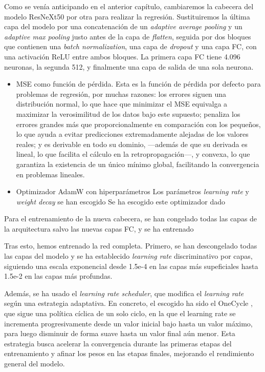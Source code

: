 Como se venía anticipando en el anterior capítulo, cambiaremos la cabecera del modelo ResNeXt50 por otra 
para realizar la regresión. Sustituiremos la última capa del modelo por una concatenación de un 
\textit{adaptive average pooling} y un \textit{adaptive max pooling} justo antes de la capa de 
\textit{flatten}, seguida por dos bloques que contienen una \textit{batch normalization}, una capa de 
\textit{dropout} y una capa FC, con una activación ReLU entre ambos bloques. La primera capa FC tiene
4.096 neuronas, la segunda 512, y finalmente una capa de salida de una sola neurona. 

\begin{itemize}
    \item MSE como función de pérdida. Esta es la función de pérdida por defecto para problemas de regresión,
        por muchas razones: los errores siguen una distribución normal, lo que hace que minimizar el MSE 
        equivalga a maximizar la verosimilitud de los datos bajo este supuesto;
        penaliza los errores grandes más que proporcionalmente en comparación con los pequeños, lo que ayuda a
        evitar predicciones extremadamente alejadas de los valores reales; y
        es derivable en todo su dominio, ---además de que su derivada es lineal, lo que facilita el cálculo en 
        la retropropagación---, y convexa, lo que garantiza la existencia de un único mínimo global, 
        facilitando la convergencia en problemas lineales.
        
    \item Optimizador AdamW \cite{loshchilov2017} con hiperparámetros 
        Los parámetros \textit{learning rate} y \textit{weight decay} se han escogido 
        Se ha escogido este optimizador dado
    
\end{itemize}

Para el entrenamiento de la nueva cabecera, se han congelado todas las capas de la arquitectura salvo las 
nuevas capas FC, y se ha entrenado 

Tras esto, hemos entrenado la red completa. Primero, se han descongelado todas las capas del modelo y se ha 
establecido \textit{learning rate} discriminativo por capas, siguiendo una escala exponencial desde 1.5e-4 en 
las capas más supeficiales hasta 1.5e-2 en las capas más profundas. 

Además, se ha usado el \textit{learning rate scheduler}, que modifica el \textit{learning rate} según una 
estrategia adaptativa. En concreto, el escogido ha sido el OneCycle \cite{smith2018}, que sigue una política
cíclica de un solo ciclo, en la que el learning rate se incrementa progresivamente desde un valor inicial bajo 
hasta un valor máximo, para luego disminuir de forma suave hasta un valor final aún menor. Esta estrategia 
busca acelerar la convergencia durante las primeras etapas del entrenamiento y afinar los pesos en las etapas 
finales, mejorando el rendimiento general del modelo.


